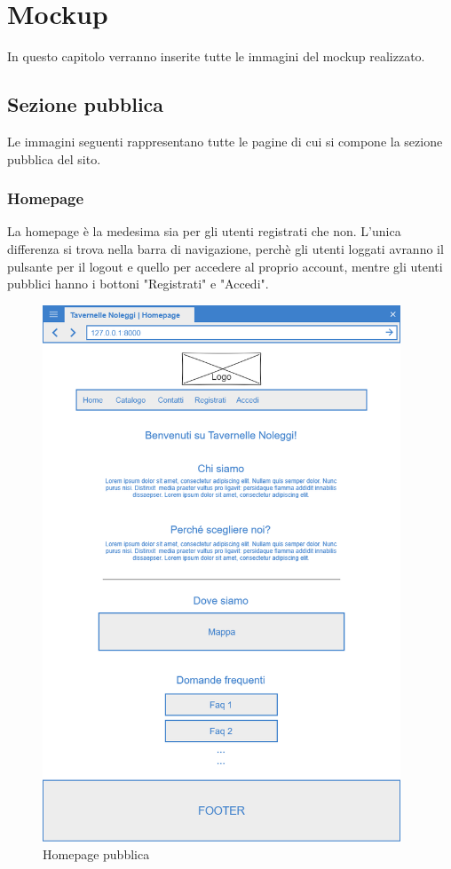 \documentclass[12pt,a4paperS]{report}
\begin{document}
	\hypertarget{mockup}{\chapter{Mockup}}
	\label{mockup}
	\begin{normalsize}
		In questo capitolo verranno inserite tutte le immagini del mockup realizzato.
		
		\section{Sezione pubblica}
			Le immagini seguenti rappresentano tutte le pagine di cui si compone la sezione pubblica del sito.
			\subsection{Homepage}
				La homepage è la medesima sia per gli utenti registrati che non.
				\newline
				L'unica differenza si trova nella barra di navigazione, perchè gli utenti loggati avranno il pulsante per il logout e quello per accedere al proprio account, mentre gli utenti pubblici hanno i bottoni "Registrati" e "Accedi".
				\begin{figure}[H]
					\centering
					\includegraphics[width=0.95\textwidth, height=0.95\textheight, keepaspectratio]{Mockup/Homepage.png}
					\caption{Homepage pubblica}
				\end{figure}
				

\end{normalsize}
\end{document}
